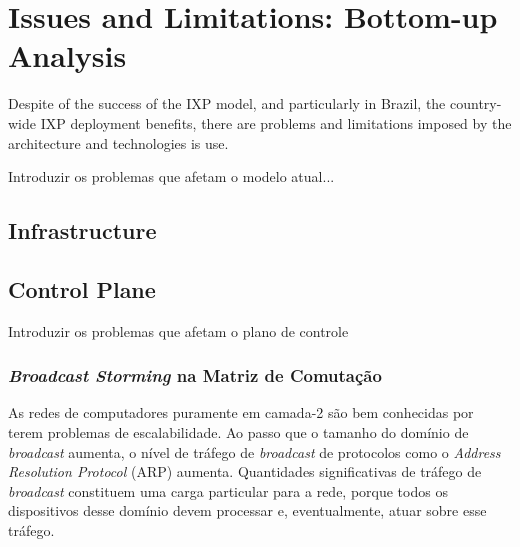 \documentclass[12pt]{article}
\begin{document}

\section{Issues and Limitations: Bottom-up Analysis}
\label{sec:analysis}
Despite of the success of the IXP model, and particularly in Brazil, the country-wide IXP deployment benefits, there are problems and limitations imposed by the architecture and technologies is use. 

Introduzir os problemas que afetam o modelo atual...
\subsection{Infrastructure}
\label{sec:infraestrutura}

\subsection{Control Plane}
\label{subsec:issues_cp}
Introduzir os problemas que afetam o plano de controle

\subsubsection{\textit{Broadcast Storming} na Matriz de Comutação}
\label{subsubsec:broadcast_storm}

As redes de computadores puramente em camada-2 são bem conhecidas por terem problemas de escalabilidade. Ao passo que o tamanho do domínio de \textit{broadcast} aumenta, o nível de tráfego de \textit{broadcast} de protocolos como o \textit{Address Resolution Protocol} (ARP) aumenta. Quantidades significativas de tráfego de \textit{broadcast} constituem uma carga particular para a rede, porque todos os dispositivos desse domínio devem processar e, eventualmente, atuar sobre esse tráfego. 
\end{document}

